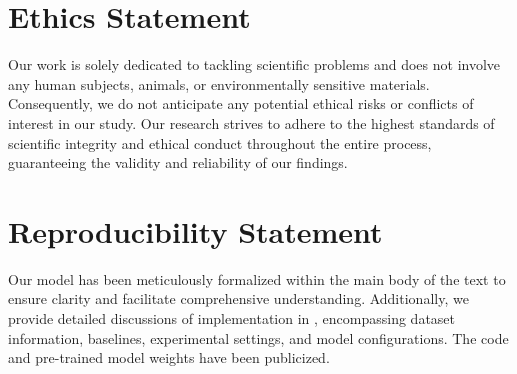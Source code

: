 \section*{Ethics Statement}
Our work is solely dedicated to tackling scientific problems and does not involve any human subjects, animals, or environmentally sensitive materials. Consequently, we do not anticipate any potential ethical risks or conflicts of interest in our study. Our research strives to adhere to the highest standards of scientific integrity and ethical conduct throughout the entire process, guaranteeing the validity and reliability of our findings.

\section*{Reproducibility Statement}
Our model has been meticulously formalized within the main body of the text to ensure clarity and facilitate comprehensive understanding. Additionally, we provide detailed discussions of implementation in , encompassing dataset information, baselines, experimental settings, and model configurations. The code and pre-trained model weights have been publicized.